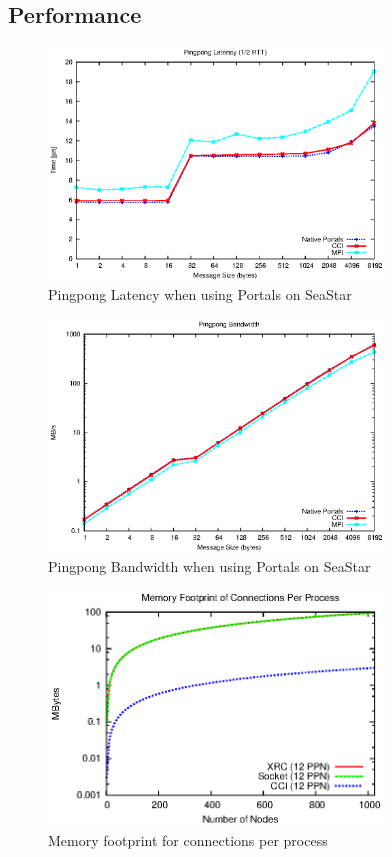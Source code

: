 \subsection{Performance}

\begin{figure}[htbp]
\centering
\includegraphics[width=3.5in]{pingpong-latency.eps}
\caption{Pingpong Latency when using Portals on SeaStar}
\label{fig:latency}
\end{figure}

\begin{figure}[htbp]
\centering
\includegraphics[width=3.5in]{pingpong-bw.eps}
\caption{Pingpong Bandwidth when using Portals on SeaStar}
\label{fig:bw}
\end{figure}

\begin{figure}[htbp]
\centering
\includegraphics[width=3.5in]{memory_log.eps}
\caption{Memory footprint for connections per process}
\label{fig:memory}
\end{figure}

